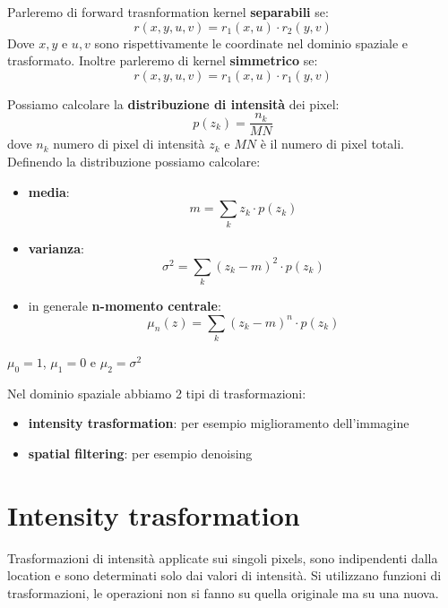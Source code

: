 Parleremo di forward trasnformation kernel \textbf{separabili} se:
\begin{equation}
    r(x,y,u,v) = r_1(x,u) \cdot r_2(y,v)
\end{equation}
Dove $x,y$ e $u,v$ sono rispettivamente le coordinate nel dominio spaziale e trasformato.
Inoltre parleremo di kernel \textbf{simmetrico} se:
\begin{equation}
    r(x,y,u,v) = r_1(x,u) \cdot r_1(y,v)
\end{equation}

Possiamo calcolare la \textbf{distribuzione di intensità} dei pixel:
\begin{equation}
    p(z_k) = \frac{n_k}{MN}
\end{equation}
dove $n_k$ numero di pixel di intensità $z_k$ e $MN$ è il numero di pixel totali.
Definendo la distribuzione possiamo calcolare:
\begin{itemize}
    \item \textbf{media}:
          \begin{equation}
              m = \sum_{k} z_k \cdot p(z_k)
          \end{equation}
    \item \textbf{varianza}:
          \begin{equation}
              \sigma^2 = \sum_{k} (z_k -m)^2 \cdot p(z_k)
          \end{equation}
    \item in generale \textbf{n-momento centrale}:
          \begin{equation}
              \mu_n(z) = \sum_{k} (z_k -m)^n \cdot p(z_k)
          \end{equation}
\end{itemize}
\begin{nota}
    $\mu_0 = 1$, $\mu_1= 0$ e $\mu_2=\sigma^2$
\end{nota}

Nel dominio spaziale abbiamo 2 tipi di trasformazioni:
\begin{itemize}
    \item \textbf{intensity trasformation}: per esempio miglioramento dell'immagine
    \item \textbf{spatial filtering}: per esempio denoising
\end{itemize}

\section{Intensity trasformation}
Trasformazioni di intensità applicate sui singoli pixels, sono indipendenti dalla
location e sono determinati solo dai valori di intensità. Si utilizzano funzioni
di trasformazioni, le operazioni non si fanno su quella originale ma su una nuova.

